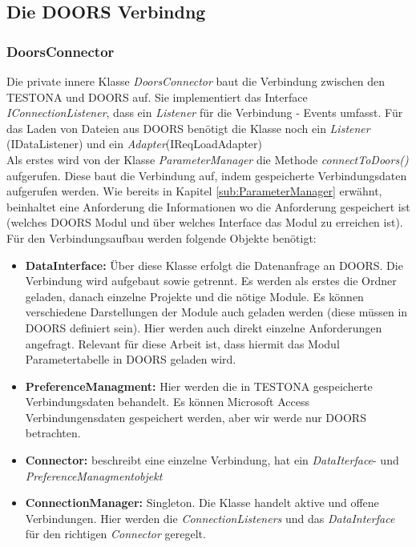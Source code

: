 \subsection{Die DOORS Verbindng}\label{sub.DoorsConn}
\subsubsection{DoorsConnector}

Die private innere Klasse \textit{DoorsConnector} baut die Verbindung zwischen den TESTONA und DOORS auf. Sie implementiert das Interface \textit{IConnectionListener}, dass ein \textit{Listener} für die Verbindung - Events umfasst. Für das Laden von Dateien aus DOORS benötigt die Klasse noch ein \textit{Listener} (IDataListener) und ein \textit{Adapter}(IReqLoadAdapter) \\

Als erstes wird von der Klasse \textit{ParameterManager} die Methode \textit{connectToDoors()} aufgerufen. Diese baut die Verbindung auf, indem gespeicherte Verbindungsdaten aufgerufen werden. Wie bereits in Kapitel \ref{sub:ParameterManager} erwähnt, beinhaltet eine Anforderung die Informationen wo die Anforderung gespeichert ist (welches DOORS Modul und über welches Interface das Modul zu erreichen ist). Für den Verbindungsaufbau werden folgende Objekte benötigt:

\begin{itemize}
\item \textbf{DataInterface: }Über diese Klasse erfolgt die Datenanfrage an DOORS. Die Verbindung wird aufgebaut sowie getrennt. Es werden als erstes die Ordner geladen, danach einzelne Projekte und die nötige Module. Es können verschiedene Darstellungen der Module auch geladen werden (diese müssen in DOORS definiert sein). Hier werden auch direkt einzelne Anforderungen angefragt. Relevant für diese Arbeit ist, dass hiermit das Modul Parametertabelle in DOORS geladen wird.

\item \textbf{PreferenceManagment: } Hier werden die in TESTONA gespeicherte Verbindungsdaten behandelt. Es können Microsoft Access Verbindungensdaten gespeichert werden, aber wir werde nur DOORS betrachten.

\item \textbf{Connector: }beschreibt eine einzelne Verbindung, hat ein \textit{DataIterface}- und \textit{PreferenceManagmentobjekt}

\item \textbf{ConnectionManager: }Singleton. Die Klasse handelt aktive und offene Verbindungen. Hier werden die \textit{ConnectionListeners} und das \textit{DataInterface} für den richtigen \textit{Connector} geregelt.

\end{itemize}


